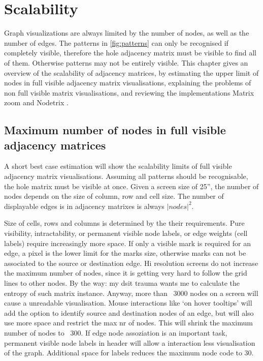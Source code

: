 \chapter{Scalability}
\label{chap:Scalability}

Graph visualizations are always limited by the number of nodes, as well as the number of edges. The patterns in \ref{fig:patterns} can only be recognised if completely visible, therefore the hole adjacency matrix must be visible to find all of them. Otherwise patterns may not be entirely visible. This chapter gives an overview of the scalability of adjacency matrices, by estimating the upper limit of nodes in full visible adjacency matrix visualisations, explaining the problems of non full visible matrix visualisations, and reviewing the implementations Matrix zoom \cite{ham} and Nodetrix \cite{henry}.


\section{Maximum number of nodes in full visible adjacency matrices}
A short best case estimation will show the scalability limits of full visible adjacency matrix visualisations. Assuming all patterns should be recognisable, the hole matrix must be visible at once. Given a screen size of 25”, the number of nodes depends on the size of column, row and cell size. The number of displayable edges is in adjacency matrixes is always $|nodes|^2$.

Size of cells, rows and columns is determined by the their requirements. Pure visibility, intractability, or permanent visible node labels, or edge weights (cell labels) require increasingly more space.
If only a visible mark is required for an edge, a pixel is the lower limit for the marks size, otherwise marks can not be associated to the source or destination edge. Hi resolution screens do not increase the maximum number of nodes, since it is getting very hard to follow the grid lines to other nodes. By the way: my dsit trauma wants me to calculate the entropy of such matrix instance. Anyway, more than ~3000 nodes on a screen will cause a unreadable visualisation.
Mouse interactions like ‘on hover tooltips’ will add the option to identify source and destination nodes of an edge, but will also use more space and restrict the max nr of nodes. This will shrink the maximum number of nodes to ~300.
If edge node assoziation is an important task, permanent visible node labels in header will allow a interaction less visualisation of the graph. Additional space for labels reduces the maximum node code to 30.
 
